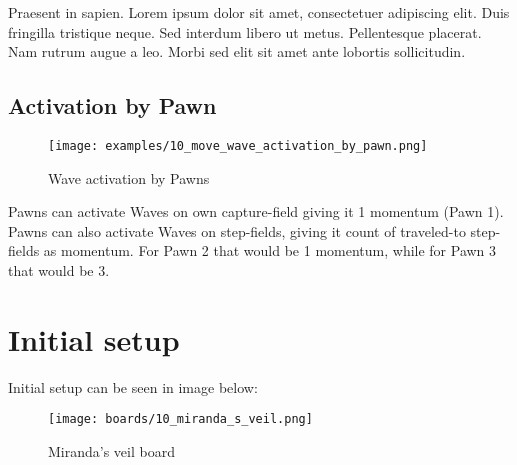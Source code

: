 Praesent in sapien. Lorem ipsum dolor sit amet, consectetuer adipiscing elit.
Duis fringilla tristique neque. Sed interdum libero ut metus. Pellentesque placerat.
Nam rutrum augue a leo. Morbi sed elit sit amet ante lobortis sollicitudin.


\clearpage %

\subsection*{Activation by Pawn}

\noindent
\begin{figure}[!h]
\texttt{[image: examples/10\_move\_wave\_activation\_by\_pawn.png]}
\caption{Wave activation by Pawns}
\label{fig:10_move_wave_activation_by_pawn}
\end{figure}

Pawns can activate Waves on own capture-field giving it 1 momentum (Pawn 1).
Pawns can also activate Waves on step-fields, giving it count of traveled-to
step-fields as momentum. For Pawn 2 that would be 1 momentum, while for Pawn 3
that would be 3.

\clearpage %

\section*{Initial setup}

Initial setup can be seen in image below:

\noindent
\begin{figure}[h]
\texttt{[image: boards/10\_miranda\_s\_veil.png]}
\caption{Miranda's veil board}
\label{fig:10_miranda_s_veil}
\end{figure}

\clearpage %
